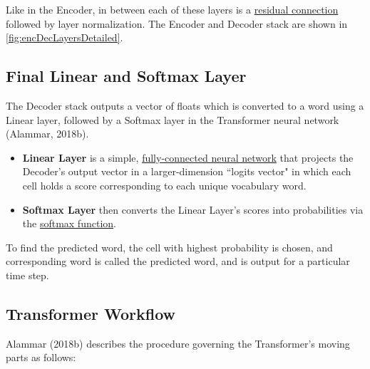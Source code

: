 Like in the Encoder, in between each of these layers is a \hyperref[sec:ResidualConnections]{residual connection} followed by layer normalization. The Encoder and Decoder stack are shown in \cref{fig:encDecLayersDetailed}. 




\subsection{Final Linear and Softmax Layer} \label{sec:TransformerFinalLayer}


The Decoder stack outputs a vector of floats which is converted to a word using a Linear layer, followed by a Softmax layer in the Transformer neural network (Alammar, 2018b). 
\begin{itemize}
    \item \textbf{Linear Layer} is a simple, \hyperref[sec:NeuralLM]{fully-connected neural network} that projects the Decoder's output vector in a larger-dimension ``logits vector" in which each cell holds a score corresponding to each unique vocabulary word. 
    
    \item \textbf{Softmax Layer} then converts the Linear Layer's scores into probabilities via the \hyperref[cnc:softmaxLayer]{softmax function}. 
\end{itemize}

To find the predicted word, the cell with highest probability is chosen, and corresponding word is called the predicted word, and is output for a particular time step.




\subsection{Transformer Workflow} \label{sec:TransformerWorkflow}

Alammar (2018b) describes the procedure governing the Transformer's moving parts as follows: 

